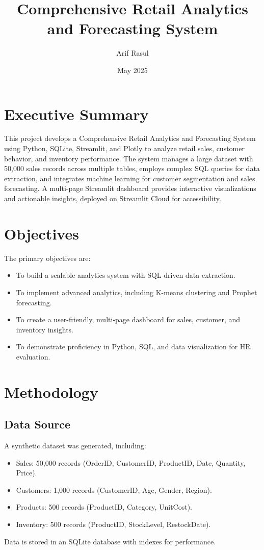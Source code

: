 \documentclass[12pt]{article}
\title{Comprehensive Retail Analytics and Forecasting System}
\author{Arif Rasul}
\date{May 2025}
\begin{document}
\maketitle

\section{Executive Summary}
This project develops a Comprehensive Retail Analytics and Forecasting System using Python, SQLite, Streamlit, and Plotly to analyze retail sales, customer behavior, and inventory performance. The system manages a large dataset with 50,000 sales records across multiple tables, employs complex SQL queries for data extraction, and integrates machine learning for customer segmentation and sales forecasting. A multi-page Streamlit dashboard provides interactive visualizations and actionable insights, deployed on Streamlit Cloud for accessibility.

\section{Objectives}
The primary objectives are:
\begin{itemize}
    \item To build a scalable analytics system with SQL-driven data extraction.
    \item To implement advanced analytics, including K-means clustering and Prophet forecasting.
    \item To create a user-friendly, multi-page dashboard for sales, customer, and inventory insights.
    \item To demonstrate proficiency in Python, SQL, and data visualization for HR evaluation.
\end{itemize}

\section{Methodology}
\subsection{Data Source}
A synthetic dataset was generated, including:
\begin{itemize}
    \item Sales: 50,000 records (OrderID, CustomerID, ProductID, Date, Quantity, Price).
    \item Customers: 1,000 records (CustomerID, Age, Gender, Region).
    \item Products: 500 records (ProductID, Category, UnitCost).
    \item Inventory: 500 records (ProductID, StockLevel, RestockDate).
\end{itemize}
Data is stored in an SQLite database with indexes for performance.
\end{document}
